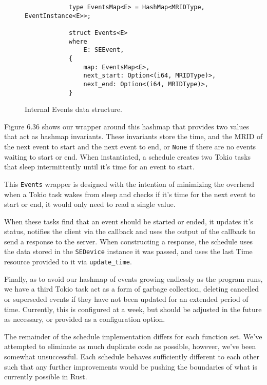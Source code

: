 \begin{figure}[h]
    \begin{center}
        \begin{lstlisting}
            type EventsMap<E> = HashMap<MRIDType, EventInstance<E>>;

            struct Events<E>
            where
                E: SEEvent,
            {
                map: EventsMap<E>,
                next_start: Option<(i64, MRIDType)>,
                next_end: Option<(i64, MRIDType)>,
            }
        \end{lstlisting}
        \label{fig:eventmapimpl}
        \vspace{-10pt}
        \caption{Internal Events data structure.}
    \end{center}
\end{figure}

Figure 6.36 shows our wrapper around this hashmap that provides two values that act as hashmap invariants. These invariants store the time, and the MRID of the next event to start and the next event to end, or \texttt{None} if there are no events waiting to start or end. When instantiated, a schedule creates two Tokio tasks that sleep intermittently until it's time for an event to start. 

This \texttt{Events} wrapper is designed with the intention of minimizing the overhead when a Tokio task wakes from sleep and checks if it's time for the next event to start or end, it would only need to read a single value.

When these tasks find that an event should be started or ended, it updates it's status, notifies the client via the callback and uses the output of the callback to send a response to the server. When constructing a response, the schedule uses the data stored in the \texttt{SEDevice} instance it was passed, and uses the last Time resource provided to it via \texttt{update\_time}.

Finally, as to avoid our hashmap of events growing endlessly as the program runs, we have a third Tokio task act as a form of garbage collection, deleting cancelled or superseded events if they have not been updated for an extended period of time. Currently, this is configured at a week, but should be adjusted in the future as necessary, or provided as a configuration option.

The remainder of the schedule implementation differs for each function set. We've attempted to eliminate as much duplicate code as possible, however, we've been somewhat unsuccessful. Each schedule behaves sufficiently different to each other such that any further improvements would be pushing the boundaries of what is currently possible in Rust.

